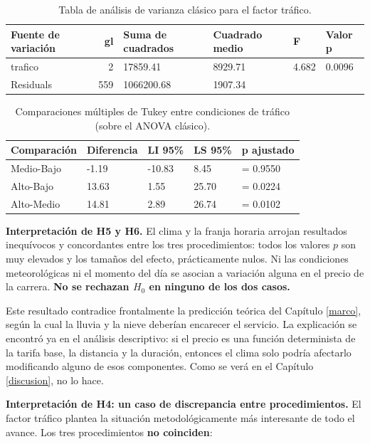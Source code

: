 \documentclass[
]{book}
\begin{document}
\begin{table}

\caption{\label{tab:anova-traf}Tabla de análisis de varianza clásico para el factor tráfico.}
\centering
\begin{tabular}[t]{l|r|l|l|l|l}
\hline
Fuente de variación & gl & Suma de cuadrados & Cuadrado medio & F & Valor p\\
\hline
trafico & 2 & 17859.41 & 8929.71 & 4.682 & 0.0096\\
\hline
Residuals & 559 & 1066200.68 & 1907.34 &  & \\
\hline
\end{tabular}
\end{table}

\begin{table}

\caption{\label{tab:tukey-traf}Comparaciones múltiples de Tukey entre condiciones de tráfico (sobre el ANOVA clásico).}
\centering
\begin{tabular}[t]{l|l|l|l|l}
\hline
Comparación & Diferencia & LI 95\% & LS 95\% & p ajustado\\
\hline
Medio-Bajo & -1.19 & -10.83 & 8.45 & = 0.9550\\
\hline
Alto-Bajo & 13.63 & 1.55 & 25.70 & = 0.0224\\
\hline
Alto-Medio & 14.81 & 2.89 & 26.74 & = 0.0102\\
\hline
\end{tabular}
\end{table}

\textbf{Interpretación de H5 y H6.} El clima y la franja horaria arrojan resultados inequívocos y
concordantes entre los tres procedimientos: todos los valores \(p\) son muy elevados y los
tamaños del efecto, prácticamente nulos. Ni las condiciones meteorológicas ni el momento del
día se asocian a variación alguna en el precio de la carrera. \textbf{No se rechazan \(H_0\) en
ninguno de los dos casos.}

Este resultado contradice frontalmente la predicción teórica del Capítulo \ref{marco}, según
la cual la lluvia y la nieve deberían encarecer el servicio. La explicación se encontró ya en
el análisis descriptivo: si el precio es una función determinista de la tarifa base, la
distancia y la duración, entonces el clima solo podría afectarlo modificando alguno de esos
componentes. Como se verá en el Capítulo \ref{discusion}, no lo hace.

\textbf{Interpretación de H4: un caso de discrepancia entre procedimientos.} El factor tráfico
plantea la situación metodológicamente más interesante de todo el avance. Los tres
procedimientos \textbf{no coinciden}:
\end{document}
